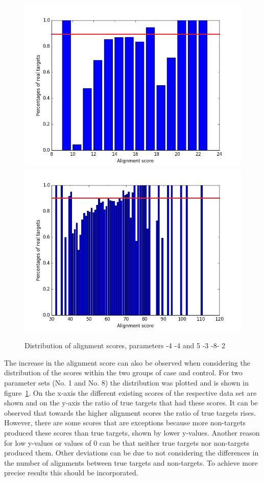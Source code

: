 \documentclass[11pt, a4paper, oneside]{book}
\begin{document}
\begin{figure}
\centering
\includegraphics[scale=0.28]{results/plot_scores-4-4_thresh.png}
\includegraphics[scale=0.28]{results/plot_scores5-3-8-2_thresh.png}
\caption{Distribution of alignment scores, parameters -4 -4 and 5 -3 -8- 2}
\label{fig:distribution}
\end{figure}

The increase in the alignment score can also be observed when considering the distribution of the scores within the two groups of case and control. For two parameter sets (No. 1 and No. 8) the distribution was plotted and is shown in figure~\ref{fig:distribution}. On the x-axis the different existing scores of the respective data set are shown and on the y-axis the ratio of true targets that had these scores. It can be observed that towards the higher alignment scores the ratio of true targets rises. However, there are some scores that are exceptions because more non-targets produced these scores than true targets, shown by lower y-values. Another reason for low y-values or values of 0 can be that neither true targets nor non-targets produced them. Other deviations can be due to not considering the differences in the number of alignments between true targets and non-targets. To achieve more precise results this should be incorporated. 
\end{document}
